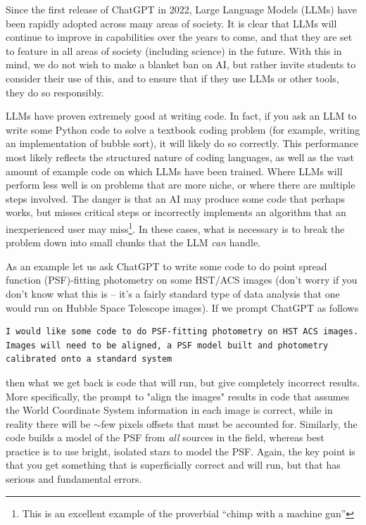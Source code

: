 \documentclass{tufte-book}
\begin{document}
Since the first release of ChatGPT in 2022, Large Language Models (LLMs) have been rapidly adopted across many areas of society. It is clear that LLMs will continue to improve in capabilities over the years to come, and that they are set to feature in all areas of society (including science) in the future. With this in mind, we do not wish to make a blanket ban on AI, but rather invite students to consider their use of this, and to ensure that if they use LLMs or other tools, they do so responsibly.

LLMs have proven extremely good at writing code. In fact, if you ask an LLM to write some Python code to solve a textbook coding problem (for example, writing an implementation of bubble sort), it will likely do so correctly. This performance most likely reflects the structured nature of coding languages, as well as the vast amount of example code on which LLMs have been trained. Where LLMs will perform less well is on problems that are more niche, or where there are multiple steps involved. The danger is that an AI may produce some code that perhaps works, but misses critical steps or incorrectly implements an algorithm that an inexperienced user may miss\footnote{This is an excellent example of the proverbial ``chimp with a machine gun''}. In these cases, what is necessary is to break the problem down into small chunks that the LLM {\it can} handle.

As an example let us ask ChatGPT to write some code to do point spread function (PSF)-fitting photometry on some HST/ACS images (don't worry if you don't know what this is -- it's a fairly standard type of data analysis that one would run on Hubble Space Telescope images). If we prompt ChatGPT as follows

\begin{lstlisting}[backgroundcolor=\color{lightgray}, breaklines=true]
I would like some code to do PSF-fitting photometry on HST ACS images. Images will need to be aligned, a PSF model built and photometry calibrated onto a standard system
\end{lstlisting}

\noindent then what we get back is code that will run, but give completely incorrect results. More specifically, the prompt to "align the images" results in code that assumes the World Coordinate System information in each image is correct, while in reality there will be $\sim$few pixels offsets that must be accounted for. Similarly, the code builds a model of the PSF from {\it all} sources in the field, whereas best practice is to use bright, isolated stars to model the PSF. Again, the key point is that you get something that is superficially correct and will run, but that has serious and fundamental errors.
\end{document}
